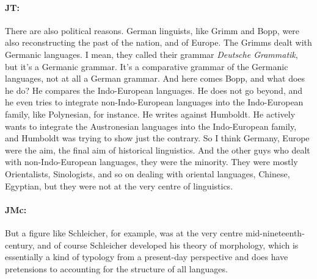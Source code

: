 \documentclass[output=paper]{langscibook}
\begin{document}
\paragraph*{JT:} There are also political reasons. German linguists, like Grimm and Bopp, were also reconstructing the past of the nation, and of Europe. The Grimms dealt with Germanic languages. I mean, they called their grammar \textit{Deutsche Grammatik}, but it’s a Germanic grammar. It’s a comparative grammar of the Germanic languages, not at all a German grammar. And here comes Bopp, and what does he do? He compares the Indo-European languages. He does not go beyond, and he even tries to integrate non-Indo-European languages into the Indo-European family, like Polynesian, for instance. He writes against Humboldt. He actively wants to integrate the Austronesian languages into the Indo-European family, and Humboldt was trying to show just the contrary. So I think Germany, Europe were the aim, the final aim of historical linguistics. And the other guys who dealt with non-Indo-European languages, they were the minority. They were mostly Orientalists, Sinologists, and so on dealing with oriental languages, Chinese, Egyptian, but they were not at the very centre of linguistics.


\paragraph*{JMc:} But a figure like Schleicher, for example, was at the very centre mid-nineteenth-century, and of course Schleicher developed his theory of morphology, which is essentially a kind of typology from a present-day perspective and does have pretensions to accounting for the structure of all languages.
\end{document}
